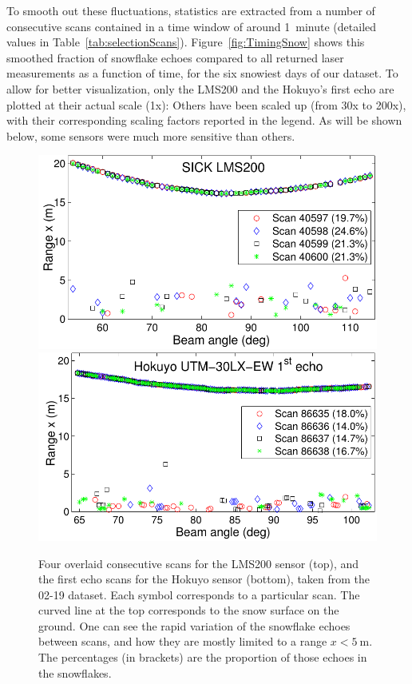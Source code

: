 To smooth out these fluctuations, statistics are extracted from a number of consecutive scans contained in a time window of around 1~minute (detailed values in Table~\ref{tab:selectionScans}). Figure~\ref{fig:TimingSnow} shows this smoothed fraction of snowflake echoes compared to all returned laser measurements as a function of time, for the six snowiest days of our dataset. To allow for better visualization, only the LMS200 and the Hokuyo's first echo are plotted at their actual scale (1x): Others have been scaled up (from 30x to 200x), with their corresponding scaling factors reported in the legend. As will be shown below, some sensors were much more sensitive than others.

\begin{figure}[h]
    \centering
    \includegraphics[trim={0.2cm 0 0 0},clip,width=0.7\linewidth]{./img/chap_lidar/LMS200_4Scans_Feb19.pdf}
    \includegraphics[trim={0.2cm 0 0 0},clip,width=0.7\linewidth]{./img/chap_lidar/Hokuyo_4Scans_Feb19.pdf}
    \caption{Four overlaid consecutive scans for the LMS200 sensor (top), and the first echo scans for the Hokuyo sensor (bottom), taken from the 02-19 dataset. Each symbol corresponds to a particular scan. The curved line at the top corresponds to the snow surface on the ground. One can see the rapid variation of the snowflake echoes between scans, and how they are mostly limited to a range $x<\SI{5}{\meter}$. The percentages (in brackets) are the proportion of those echoes in the snowflakes.}
    \label{fig:LMS200_4Scans_Feb19}
\end{figure}

